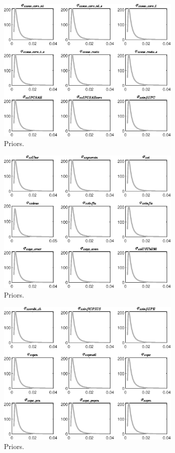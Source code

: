  
\begin{figure}[H]
\centering
\includegraphics[width=0.80\textwidth]{calculate_estimate/graphs/calculate_estimate_Priors1}
\caption{Priors.}\label{Fig:Priors:1}
\end{figure}
\begin{figure}[H]
\centering
\includegraphics[width=0.80\textwidth]{calculate_estimate/graphs/calculate_estimate_Priors2}
\caption{Priors.}\label{Fig:Priors:2}
\end{figure}
\begin{figure}[H]
\centering
\includegraphics[width=0.80\textwidth]{calculate_estimate/graphs/calculate_estimate_Priors3}
\caption{Priors.}\label{Fig:Priors:3}
\end{figure}

